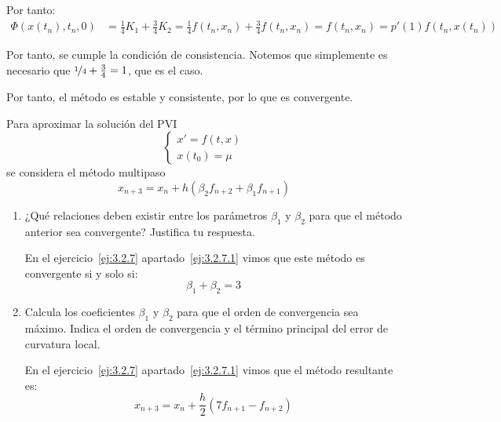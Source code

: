 \begin{ejercicio}
\begin{itemize}
        Por tanto:
        \begin{align*}
            \Phi(x(t_n), t_n, 0) &= \frac{1}{4}K_1 + \frac{3}{4}K_2 = \frac{1}{4}f(t_n, x_n) + \frac{3}{4}f(t_n, x_n) = f(t_n, x_n) = p'(1)f(t_n, x(t_n))
        \end{align*}

        Por tanto, se cumple la condición de consistencia. Notemos que simplemente es necesario que $\nicefrac{1}{4} + \frac{3}{4} = 1$, que es el caso.
    \end{itemize}

    Por tanto, el método es estable y consistente, por lo que es convergente.
\end{ejercicio}


\begin{ejercicio}
    Para aproximar la solución del PVI
    \begin{equation*}
        \begin{cases}
            x' = f(t, x) \\
            x(t_0) = \mu
        \end{cases}
    \end{equation*}
    se considera el método multipaso
    \begin{equation*}
        x_{n+3} = x_n + h(\beta_2 f_{n+2} + \beta_1 f_{n+1})
    \end{equation*}
    \begin{enumerate}
        \item ¿Qué relaciones deben existir entre los parámetros $\beta_1$ y $\beta_2$ para que el método anterior sea convergente? Justifica tu respuesta.
        
        En el ejercicio~\ref{ej:3.2.7} apartado~\ref{ej:3.2.7.1} vimos que este método es convergente si y solo si:
        \begin{equation*}
            \beta_1 + \beta_2 = 3
        \end{equation*}
        \item Calcula los coeficientes $\beta_1$ y $\beta_2$ para que el orden de convergencia sea máximo. Indica el orden de convergencia y el término principal del error de curvatura local.
        
        En el ejercicio~\ref{ej:3.2.7} apartado~\ref{ej:3.2.7.1} vimos que el método resultante es:
        \begin{equation*}
            x_{n+3} = x_n + \frac{h}{2}\left(7 f_{n+1} - f_{n+2}\right)
        \end{equation*}


\end{enumerate}
\end{ejercicio}
